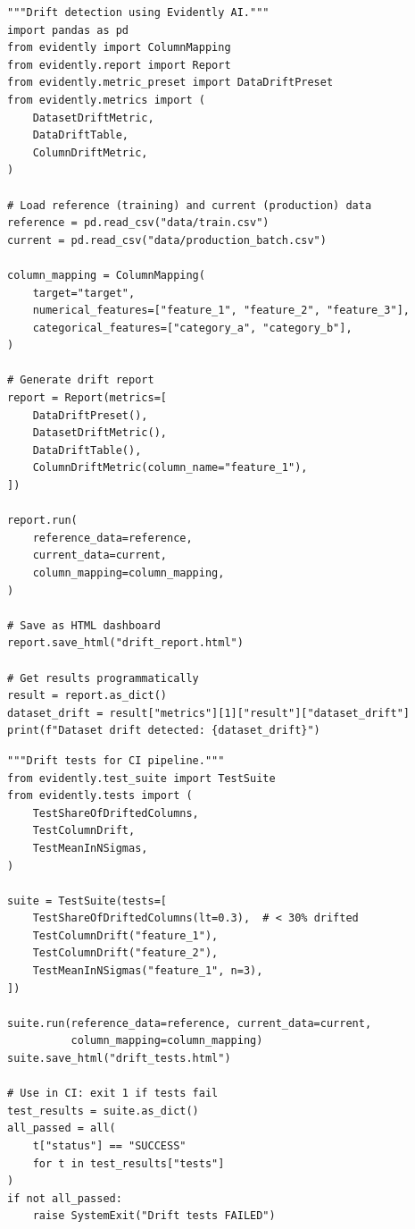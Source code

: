 \begin{codeblock}[title=\textbf{Data drift detection with Evidently}]
\begin{verbatim}
"""Drift detection using Evidently AI."""
import pandas as pd
from evidently import ColumnMapping
from evidently.report import Report
from evidently.metric_preset import DataDriftPreset
from evidently.metrics import (
    DatasetDriftMetric,
    DataDriftTable,
    ColumnDriftMetric,
)

# Load reference (training) and current (production) data
reference = pd.read_csv("data/train.csv")
current = pd.read_csv("data/production_batch.csv")

column_mapping = ColumnMapping(
    target="target",
    numerical_features=["feature_1", "feature_2", "feature_3"],
    categorical_features=["category_a", "category_b"],
)

# Generate drift report
report = Report(metrics=[
    DataDriftPreset(),
    DatasetDriftMetric(),
    DataDriftTable(),
    ColumnDriftMetric(column_name="feature_1"),
])

report.run(
    reference_data=reference,
    current_data=current,
    column_mapping=column_mapping,
)

# Save as HTML dashboard
report.save_html("drift_report.html")

# Get results programmatically
result = report.as_dict()
dataset_drift = result["metrics"][1]["result"]["dataset_drift"]
print(f"Dataset drift detected: {dataset_drift}")
\end{verbatim}
\end{codeblock}

\begin{codeblock}[title=\textbf{Evidently test suite for CI}]
\begin{verbatim}
"""Drift tests for CI pipeline."""
from evidently.test_suite import TestSuite
from evidently.tests import (
    TestShareOfDriftedColumns,
    TestColumnDrift,
    TestMeanInNSigmas,
)

suite = TestSuite(tests=[
    TestShareOfDriftedColumns(lt=0.3),  # < 30% drifted
    TestColumnDrift("feature_1"),
    TestColumnDrift("feature_2"),
    TestMeanInNSigmas("feature_1", n=3),
])

suite.run(reference_data=reference, current_data=current,
          column_mapping=column_mapping)
suite.save_html("drift_tests.html")

# Use in CI: exit 1 if tests fail
test_results = suite.as_dict()
all_passed = all(
    t["status"] == "SUCCESS"
    for t in test_results["tests"]
)
if not all_passed:
    raise SystemExit("Drift tests FAILED")
\end{verbatim}
\end{codeblock}

